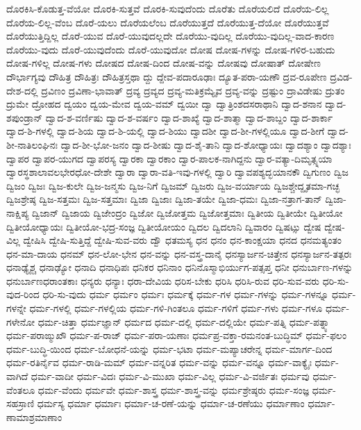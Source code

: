 {ದೊರಕಿಸಿ-ಕೊಡುತ್ತ-ವೆಯೋ
ದೊರಕಿ-ಸುತ್ತವೆ
ದೊರಕಿ-ಸುವುದೆಂದು
ದೊರೆತು
ದೊರೆಯಲಿದೆ
ದೊರೆಯ-ಲಿಲ್ಲ
ದೊರೆಯ-ಲಿಲ್ಲ-ವೆಂಬ
ದೊರೆ-ಯಲು
ದೊರೆಯಲೆಂಬ
ದೊರೆಯುತ್ತದೆ
ದೊರೆಯುತ್ತ-ದೆಯೋ
ದೊರೆಯುತ್ತವೆ
ದೊರೆಯುತ್ತಿದ್ದಿಲ್ಲ
ದೊರೆ-ಯುವ
ದೊರೆ-ಯುವುದಲ್ಲದೇ
ದೊರೆಯು-ವುದಿಲ್ಲ
ದೊರೆಯು-ವುದಿಲ್ಲ-ವಾದ-ಕಾರಣ
ದೊರೆಯು-ವುದು
ದೊರೆ-ಯುವುದೆಂದು
ದೊರೆ-ಯುವುದೋ
ದೋಷ
ದೋಷ-ಗಳನ್ನು
ದೋಷ-ಗಳಿರ-ಬಹುದು
ದೋಷ-ಗಳಿಲ್ಲ
ದೋಷ-ಗಳು
ದೋಷದ
ದೋಷ-ದಿಂದ
ದೋಷ-ವನ್ನು
ದೋಷವು
ದೋಷಾತ್
ದೋಷೇಣ
ದೌರ್ಭಾಗ್ಯವು
ದೌಹಿತ್ರ
ದೌಹಿತ್ರಃ
ದೌಹಿತ್ರಸ್ತಥಾ
ದ್ದು
ದ್ದೇವ-ಪದಾರೂಢಾಃ
ದ್ಯೂತ-ಪರಾ-ಯಣೌ
ದ್ರವ-ರೂಪೇಣ
ದ್ರವಿಡ-ದೇಶ-ದಲ್ಲಿ
ದ್ರವಿಣಂ
ದ್ರವಿಣಾ-ಭಾವಾತ್
ದ್ರವ್ಯ
ದ್ರವ್ಯದ
ದ್ರವ್ಯ-ಮತಿಕ್ರಮ್ಯೈವ
ದ್ರವ್ಯ-ವನ್ನು
ದ್ರಷ್ಟುಂ
ದ್ರಾವಿಡೇಷು
ದ್ರುತಂ
ದ್ರುಮೇ
ದ್ರೋಹದ
ದ್ವಯಂ
ದ್ವಯ-ಮೇವ
ದ್ವಯ-ವಮ್
ದ್ವಯೀ
ದ್ವಾ
ದ್ವಾತ್ರಿಂಶದಸರಾಥಾನಿ
ದ್ವಾದ-ಶನಾನ
ದ್ವಾದ-ಶಪುಂಡ್ರಾನ್
ದ್ವಾದ-ಶ-ವರ್ಣಿಷು
ದ್ವಾದ-ಶ-ವರ್ಷಂ
ದ್ವಾದ-ಶಾಖ್ಯೆ
ದ್ವಾದ-ಶಾತ್ಮಾ
ದ್ವಾದ-ಶಾಬ್ದಂ
ದ್ವಾದ-ಶಾರ್ಕಾ
ದ್ವಾದ-ಶಿ-ಗಳಲ್ಲಿ
ದ್ವಾದ-ಶಿಯ
ದ್ವಾದ-ಶಿ-ಯಲ್ಲಿ
ದ್ವಾದ-ಶಿಯು
ದ್ವಾದಶೀ
ದ್ವಾದ-ಶೀ-ಗಳಲ್ಲಿಯೂ
ದ್ವಾದ-ಶೀಗೆ
ದ್ವಾದ-ಶೀ-ನಾತಿಲಂಘಿನಃ
ದ್ವಾದ-ಶೀ-ಭೋ-ಜನಂ
ದ್ವಾದ-ಶೀಷು
ದ್ವಾದ-ಶೈ-ತಾನಿ
ದ್ವಾದ-ಶೋಧ್ಯಾಯಃ
ದ್ವಾದಶ್ಯಾಂ
ದ್ವಾದಶ್ಯಾಃ
ದ್ವಾಪರ
ದ್ವಾಪರ-ಯುಗದ
ದ್ವಾಪರಸ್ಯ
ದ್ವಾರಕಾ
ದ್ವಾರಕಾಂ
ದ್ವಾರ-ಪಾಲಕ-ನಾಗಿದ್ದನು
ದ್ವಾರ-ವತ್ಯಾ-ದಿಮೃತ್ಸ್ನಯಾ
ದ್ವಾರಸ್ಥಶಾಲಾವಲಭೇರಧೋ-ದೇಶೇ
ದ್ವಾರಾ
ದ್ವಾರಾ-ವತಿ-ಇವು-ಗಳಲ್ಲಿ
ದ್ವಾರಿ
ದ್ವಾವಪಶ್ಯದ್ಭಯಾನಕೌ
ದ್ವಿಗುಣಂ
ದ್ವಿಜ
ದ್ವಿಜಂ
ದ್ವಿಜಃ
ದ್ವಿಜ-ಕುಲೇ
ದ್ವಿಜ-ಜನ್ಮಸು
ದ್ವಿಜ-ನಿಗೆ
ದ್ವಿಜಮ್
ದ್ವಿಜರು
ದ್ವಿಜ-ವರ್ಯಾಯ
ದ್ವಿಜಶ್ಚೇದ್ದೃತಮಾ-ಗಚ್ಛ
ದ್ವಿಜಶ್ರೇಷ್ಠ
ದ್ವಿಜ-ಸತ್ತಮಃ
ದ್ವಿಜ-ಸತ್ತಮಾಃ
ದ್ವಿಜಾ
ದ್ವಿಜಾಃ
ದ್ವಿಜಾ-ತಯೇ
ದ್ವಿಜಾ-ಧಮಃ
ದ್ವಿಜಾ-ನತ್ರಾಗ-ತಾನ್
ದ್ವಿಜಾ-ನಾಕ್ಷಿಪ್ಯ
ದ್ವಿಜಾನ್
ದ್ವಿಜಾಯ
ದ್ವಿಜೇಂದ್ರಂ
ದ್ವಿಜೋ
ದ್ವಿಜೋತ್ತಮ
ದ್ವಿಜೋತ್ತಮಾಃ
ದ್ವಿತೀಯ
ದ್ವಿತೀಯೇ
ದ್ವಿತೀಯೋ
ದ್ವಿತೀಯೋಧ್ಯಾಯಃ
ದ್ವಿತೀಯೋ-ಭದ್ರ-ಸಂಜ್ಞ
ದ್ವಿತೀಯೋಯಂ
ದ್ವಿದಲ
ದ್ವಿದಲಾನಿ
ದ್ವಿವಾರಂ
ದ್ವಿಷಟ್ಸು
ದ್ವೇಷ
ದ್ವೇಷ-ವಿಲ್ಲ
ದ್ವೇಷಿಸಿ
ದ್ವೇಷಿ-ಸುತ್ತಿದ್ದೆ
ದ್ವೇಷಿ-ಸುವ-ವರು
ದ್ವೌ
ಧತಮಸ್ಯ
ಧನ
ಧನಂ
ಧನ-ಕಾಂಕ್ಷಯಾ
ಧನದ
ಧನಮತ್ಯಂತಂ
ಧನ-ಮಾ-ದಾಯ
ಧನಮ್
ಧನ-ಲೋ-ಭೇನ
ಧನ-ವನ್ನು
ಧನ-ವಸ್ತ್ರ-ದಾನೈ
ಧನಸ್ಯಾರ್ಜನ-ಚಿತ್ತೇನ
ಧನಸ್ಯಾರ್ಜನ-ತತ್ಪರಃ
ಧನಾಢ್ಯೈಶ್ಚ
ಧನಾಢ್ಯೋ
ಧನಾದಿ
ಧನಾಧಿಪಃ
ಧನಿಕರ
ಧನಿನಾಂ
ಧನಿನೊಸ್ಮಾಭಿರ್ಯುಗ-ಪತ್ಸಪ್ತ
ಧನೀ
ಧನುರ್ಬಾಣ-ಗಳನ್ನು
ಧನುರ್ಬಾಣಧರಾಂತಕಾಃ
ಧನ್ಯರು
ಧನ್ಯಾಃ
ಧರಾ-ದೇವಿಯ
ಧರಿಸ-ಬೇಕು
ಧರಿಸಿ
ಧರಿಸಿ-ರುವ
ಧರಿ-ಸುವ-ವರು
ಧರಿ-ಸು-ವುದ-ರಿಂದ
ಧರಿ-ಸು-ವುದು
ಧರ್ಮ
ಧರ್ಮಂ
ಧರ್ಮಃ
ಧರ್ಮಕ್ಕೆ
ಧರ್ಮ-ಗಳ
ಧರ್ಮ-ಗಳನ್ನು
ಧರ್ಮ-ಗಳನ್ನೂ
ಧರ್ಮ-ಗಳನ್ನೇ
ಧರ್ಮ-ಗಳಲ್ಲಿ
ಧರ್ಮ-ಗಳಲ್ಲಿಯ
ಧರ್ಮ-ಗಳಿ-ಗಿಂತಲೂ
ಧರ್ಮ-ಗಳಿಗೆ
ಧರ್ಮ-ಗಳು
ಧರ್ಮ-ಗಳೂ
ಧರ್ಮ-ಗಳೇನೋ
ಧರ್ಮ-ಚಿತ್ತಾ
ಧರ್ಮಜ್ಞಾನ್
ಧರ್ಮದ
ಧರ್ಮ-ದಲ್ಲಿ
ಧರ್ಮ-ದಲ್ಲಿಯೇ
ಧರ್ಮ-ಪತ್ನಿ
ಧರ್ಮ-ಪತ್ನ್ಯಾ
ಧರ್ಮ-ಪರಾಙ್ಮುಖೌ
ಧರ್ಮ-ಪ-ರಾಜ್
ಧರ್ಮ-ಪರಾ-ಯಣಾಃ
ಧರ್ಮಪ್ರ-ವಕ್ತಾ-ರಮನಂತ-ಬುದ್ಧಿಮ್
ಧರ್ಮ-ಫಲಂ
ಧರ್ಮ-ಬುದ್ಧಿ-ಯಿಂದ
ಧರ್ಮ-ಬೋಧನೆ-ಯನ್ನು
ಧರ್ಮ-ಭಟಾ
ಧರ್ಮ-ಮಪ್ಯಾಚರೇನ್ನ
ಧರ್ಮ-ಮಾರ್ಗ-ದಿಂದ
ಧರ್ಮ-ರತಿರ್ನೈವ
ಧರ್ಮ-ರಾಡಿ-ಮಮ್
ಧರ್ಮ-ವನ್ನರಿತ
ಧರ್ಮ-ವನ್ನು
ಧರ್ಮ-ವನ್ನೂ
ಧರ್ಮ-ವಾಕ್ಯೈಃ
ಧರ್ಮ-ವಾಗಿದೆ
ಧರ್ಮ-ವಾದೀ
ಧರ್ಮ-ವಿದಃ
ಧರ್ಮ-ವಿ-ಮುಖಾ
ಧರ್ಮ-ವಿಲ್ಲ
ಧರ್ಮ-ವಿ-ವರ್ಜಿತಃ
ಧರ್ಮವು
ಧರ್ಮ-ವೆಂತಲೂ
ಧರ್ಮ-ವೆಂದು
ಧರ್ಮವೇ
ಧರ್ಮ-ಶಾಸ್ತ್ರ
ಧರ್ಮ-ಶಾಸ್ತ್ರ-ವನ್ನು
ಧರ್ಮಶ್ರೇಷ್ಠರು
ಧರ್ಮ-ಸಂಜ್ಞ
ಧರ್ಮ-ಸಹಸ್ರಾಣಿ
ಧರ್ಮಸ್ಯ
ಧರ್ಮಾ
ಧರ್ಮಾಃ
ಧರ್ಮಾ-ಚ-ರಣೆ-ಯನ್ನು
ಧರ್ಮಾ-ಚ-ರಣೆಯು
ಧರ್ಮಾಣಾಂ
ಧರ್ಮಾ-ಣಾಮಾಶ್ರಮಾಣಾಂ
}
